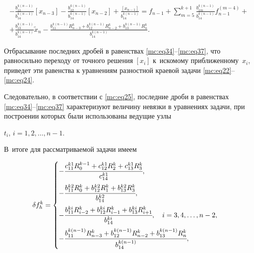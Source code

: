 \begin{multline}

\label{mc:eq37}  

-\frac{b_{11}^{k(n-1)}}{b_{14}^{k(n-1)}} [x_{n-3}]-\frac{b_{12}^{k(n-1)}}{b_{14}^{k(n-1)}} [x_{n-2}]+\frac{[x_{n-1}]}{b_{14}^{k(n-1)}}


=f_{n-1}+\sum_{m=5}^{k+1}\frac{b_{1m}^{k(n-1)}}{b_{14}^{k(n-1)}} f_{n-1}^{(m-4)}+

\\+

\frac{b_{13}^{k(n-1)}}{b_{14}^{k(n-1)}} \widetilde{x}_n


-\frac{b_{11}^{k(n-1)} R_{n-3}^k+b_{12}^{k(n-1)} R_{n-2}^k+b_{13}^{k(n-1)} R_{n}^k}{b_{14}^{k(n-1)}}.

\end{multline}



Отбрасывание  последних дробей в равенствах \eqref{mc:eq34}--\eqref{mc:eq37}, что равносильно переходу от точного решения $   [x_i]$ к~искомому приближенному~$   x_i$, приведет эти равенства к уравнениям разностной краевой задачи  \eqref{mc:eq22}--\eqref{mc:eq24}.

Следовательно, в соответствии с \eqref{mc:eq25}, последние дроби в равенствах \eqref{mc:eq34}--\eqref{mc:eq37} характеризуют величину невязки в уравнениях задачи, при построении которых были использованы ведущие узлы

$t_i$, $i=1,  2,  \dots,  n-1$. 

В~итоге для рассматриваемой задачи имеем

\begin{equation}

\label{mc:eq38}

   \delta f_{h}^k=

\begin{cases}

-\cfrac{c_{11}^{k1} R_{0}^{k-1}+c_{12}^{k1} R_{2}^k+c_{13}^{k1} R_{3}^k}{c_{14}^{k1}},

\\[4mm]

-\cfrac{b_{11}^{k2} R_{0}^k+b_{12}^{k2} R_{1}^k+b_{13}^{k2} R_{3}^k}{b_{14}^{k2}},

\\[4mm]

-\cfrac{b_{11}^{ki} R_{i-2}^k+b_{12}^{ki} R_{i-1}^k+b_{13}^{ki} R_{i+1}^k}{b_{14}^{ki}}

,\quad i=3,  4,  \dots,  n-2,

\\[4mm]

-\cfrac{b_{11}^{k(n-1)} R_{n-3}^k+b_{12}^{k(n-1)} R_{n-2}^k+b_{13}^{k(n-1)} R_{n}^k}{b_{14}^{k(n-1)}},

\end{cases}

\end{equation}

